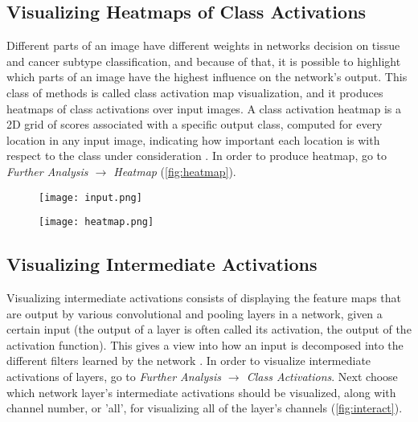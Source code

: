 \subsection{Visualizing Heatmaps of Class Activations}

Different parts of an image have different weights in networks decision on tissue and cancer subtype classification, and because of that, it is possible to highlight which parts of an image have the highest influence on the network's output. This class of methods is called class activation map visualization, and it produces heatmaps of class activations over input images. A class activation heatmap is a 2D grid of scores associated with a specific output class, computed for every location in any input image, indicating how important each location is with respect to the class under consideration \cite{chollet2018deep}. In order to produce heatmap, go to \emph{Further Analysis $\rightarrow$ Heatmap} (\textcolor{red}{\autoref{fig:heatmap}}).

\begin{figure}[h]
	\centering
	\begin{minipage}{.5\textwidth}
		\vspace*{0.5cm}
		\centering
		\texttt{[image: input.png]}
		\label{fig:input}
	\end{minipage}%
	\begin{minipage}{.5\textwidth}
		\centering
		\texttt{[image: heatmap.png]}
		\label{fig:heatmap}
	\end{minipage}
\end{figure}

\subsection{Visualizing Intermediate Activations}

Visualizing intermediate activations consists of displaying the feature maps that are output by various convolutional and pooling layers in a network, given a certain input (the output of a layer is often called its activation, the output of the activation function). This gives a view into how an input is decomposed into the different filters learned by the network \cite{chollet2018deep}. In order to visualize intermediate activations of layers, go to \emph{Further Analysis $\rightarrow$ Class Activations}. Next choose which network layer's intermediate activations should be visualized, along with channel number, or 'all', for visualizing all of the layer's channels  (\textcolor{red}{\autoref{fig:interact}}).

